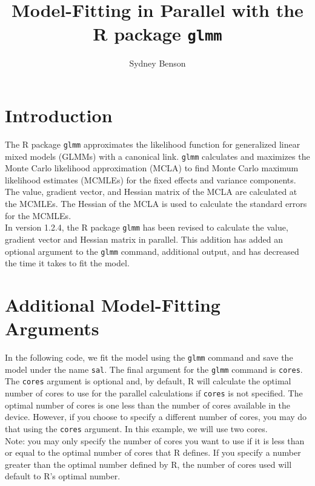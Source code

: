 \documentclass[11pt]{article}
\title{Model-Fitting in Parallel with the R package \texttt{glmm}}
\author{Sydney Benson}
\begin{document}


\maketitle
\setlength\parindent{0pt}
\tableofcontents

\break
\section{Introduction}
The R package \texttt{glmm} approximates the likelihood function for generalized linear mixed models (GLMMs) with a canonical link. \texttt{glmm} calculates and maximizes the Monte Carlo likelihood approximation (MCLA) to find Monte Carlo maximum likelihood estimates (MCMLEs) for the fixed effects and variance components. The value, gradient vector, and Hessian matrix of the MCLA are calculated at the MCMLEs. The Hessian of the MCLA is used to calculate the standard errors for the MCMLEs. \\

In version 1.2.4, the R package \texttt{glmm} has been revised to calculate the value, gradient vector and Hessian matrix in parallel. This addition has added an optional argument to the \texttt{glmm} command, additional output, and has decreased the time it takes to fit the model. \\

\section{Additional Model-Fitting Arguments}
In the following code, we fit the model using the \texttt{glmm} command and save the model under the name  \texttt{sal}. The final argument for the \texttt{glmm} command is \texttt{cores}. The \texttt{cores} argument is optional and, by default, R will calculate the optimal number of cores to use for the parallel calculations if \texttt{cores} is not specified. The optimal number of cores is one less than the number of cores available in the device. However, if you choose to specify a different number of cores, you may do that using the \texttt{cores} argument. In this example, we will use two cores. \\

Note: you may only specify the number of cores you want to use if it is less than or equal to the optimal number of cores that R defines. If you specify a number greater than the optimal number defined by R, the number of cores used will default to R's optimal number. \\
\end{document}
